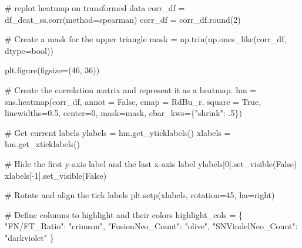 \documentclass[
  letterpaper,
  DIV=11,
  numbers=noendperiod]{scrartcl}
\newenvironment{Shaded}{\begin{snugshade}}{\end{snugshade}}
\newcommand{\BuiltInTok}[1]{\textcolor[rgb]{0.00,0.23,0.31}{#1}}
\newcommand{\CommentTok}[1]{\textcolor[rgb]{0.37,0.37,0.37}{#1}}
\newcommand{\DecValTok}[1]{\textcolor[rgb]{0.68,0.00,0.00}{#1}}
\newcommand{\FloatTok}[1]{\textcolor[rgb]{0.68,0.00,0.00}{#1}}
\newcommand{\NormalTok}[1]{\textcolor[rgb]{0.00,0.23,0.31}{#1}}
\newcommand{\OperatorTok}[1]{\textcolor[rgb]{0.37,0.37,0.37}{#1}}
\newcommand{\StringTok}[1]{\textcolor[rgb]{0.13,0.47,0.30}{#1}}
\newcommand{\VariableTok}[1]{\textcolor[rgb]{0.07,0.07,0.07}{#1}}
\begin{document}
\begin{Shaded}
\begin{Highlighting}[]
\CommentTok{\# replot heatmap on transformed data}
\NormalTok{corr\_df }\OperatorTok{=}\NormalTok{ df\_dcat\_ss.corr(method}\OperatorTok{=}\StringTok{\textquotesingle{}spearman\textquotesingle{}}\NormalTok{)}
\NormalTok{corr\_df }\OperatorTok{=}\NormalTok{ corr\_df.}\BuiltInTok{round}\NormalTok{(}\DecValTok{2}\NormalTok{)}

\CommentTok{\# Create a mask for the upper triangle}
\NormalTok{mask }\OperatorTok{=}\NormalTok{ np.triu(np.ones\_like(corr\_df, dtype}\OperatorTok{=}\BuiltInTok{bool}\NormalTok{))}

\NormalTok{plt.figure(figsize}\OperatorTok{=}\NormalTok{(}\DecValTok{46}\NormalTok{, }\DecValTok{36}\NormalTok{))}

\CommentTok{\# Create the correlation matrix and represent it as a heatmap.}
\NormalTok{hm }\OperatorTok{=}\NormalTok{ sns.heatmap(corr\_df, annot }\OperatorTok{=} \VariableTok{False}\NormalTok{, cmap }\OperatorTok{=} \StringTok{\textquotesingle{}RdBu\_r\textquotesingle{}}\NormalTok{, square }\OperatorTok{=} \VariableTok{True}\NormalTok{, linewidths}\OperatorTok{=}\FloatTok{0.5}\NormalTok{, center}\OperatorTok{=}\DecValTok{0}\NormalTok{, mask}\OperatorTok{=}\NormalTok{mask, cbar\_kws}\OperatorTok{=}\NormalTok{\{}\StringTok{"shrink"}\NormalTok{: }\FloatTok{.5}\NormalTok{\})}

\CommentTok{\# Get current labels}
\NormalTok{ylabels }\OperatorTok{=}\NormalTok{ hm.get\_yticklabels()}
\NormalTok{xlabels }\OperatorTok{=}\NormalTok{ hm.get\_xticklabels()}

\CommentTok{\# Hide the first y{-}axis label and the last x{-}axis label}
\NormalTok{ylabels[}\DecValTok{0}\NormalTok{].set\_visible(}\VariableTok{False}\NormalTok{)}
\NormalTok{xlabels[}\OperatorTok{{-}}\DecValTok{1}\NormalTok{].set\_visible(}\VariableTok{False}\NormalTok{)}

\CommentTok{\# Rotate and align the tick labels}
\NormalTok{plt.setp(xlabels, rotation}\OperatorTok{=}\DecValTok{45}\NormalTok{, ha}\OperatorTok{=}\StringTok{\textquotesingle{}right\textquotesingle{}}\NormalTok{)}

\CommentTok{\# Define columns to highlight and their colors}
\NormalTok{highlight\_cols }\OperatorTok{=}\NormalTok{ \{}
    \StringTok{"FN/FT\_Ratio"}\NormalTok{: }\StringTok{"crimson"}\NormalTok{,}
    \StringTok{"FusionNeo\_Count"}\NormalTok{: }\StringTok{"olive"}\NormalTok{,}
    \StringTok{"SNVindelNeo\_Count"}\NormalTok{: }\StringTok{"darkviolet"}
\NormalTok{\}}


\end{Highlighting}
\end{Shaded}
\end{document}
